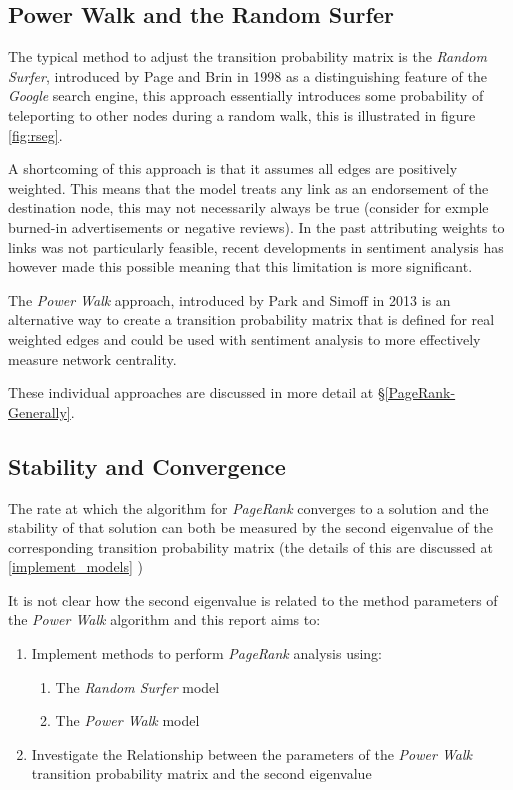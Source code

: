 \documentclass[11pt]{report}
\begin{document}
\subsection{Power Walk and the Random Surfer}
\label{sec:org109f9e7}
The typical method to adjust the transition probability matrix is the \emph{Random
Surfer}, introduced by Page and Brin in 1998
 \cite{larrypageAnatomyLargescaleHypertextual1998} as a distinguishing feature of
the \emph{Google} search engine, this approach essentially introduces some probability
of teleporting to other nodes during a random walk, this is illustrated in
figure \ref{fig:rseg}.

A shortcoming of this approach is that it assumes all edges are positively weighted. This
means that the model treats any link as an endorsement of the destination
node, this may not necessarily always be true (consider for exmple burned-in
advertisements or negative reviews). In the past attributing weights to links was not particularly feasible, recent developments in sentiment analysis has however made this possible meaning that this limitation is more significant.

The \emph{Power Walk} approach, introduced by Park and Simoff in 2013 \cite{parkPowerWalkRevisiting2013} is an alternative way to create a transition
probability matrix that is defined for real weighted edges and could be used with sentiment analysis to more effectively measure network centrality.

These individual approaches are discussed in more detail at \S \ref{PageRank-Generally}.

\subsection{Stability and Convergence}
\label{sec:orgcefa601}

The rate at which the algorithm for \emph{PageRank} converges to a solution and the stability of that solution can both be measured by the second eigenvalue of the corresponding transition probability matrix (the details of this are discussed at \ref{implement_models} )

It is not clear how the second eigenvalue is related to the method parameters of the \emph{Power Walk} algorithm \cite[]{parkPowerWalkRevisiting2013} and this report aims to:

\begin{enumerate}
\item Implement methods to perform \emph{PageRank} analysis using:
\begin{enumerate}
\item The \emph{Random Surfer} model
\item The \emph{Power Walk} model
\end{enumerate}
\item Investigate the Relationship between the parameters of the \emph{Power Walk}
transition probability matrix and the second eigenvalue
\end{enumerate}
\end{document}

